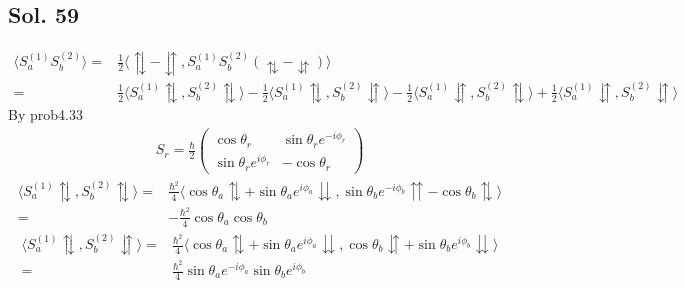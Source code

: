         \subsection*{Sol. 59}
        \begin{align*}
            \langle S_a^{(1)}S_b^{(2)}\rangle= & 
            \frac{1}{2}
            \langle \updownarrows - \downuparrows, 
            S_a^{(1)}S_b^{(2)}
            (\updownarrows - \downuparrows)
            \rangle\\
            =&
            \frac{1}{2}
            \langle S_a^{(1)}\updownarrows, S_b^{(2)}\updownarrows\rangle
            -\frac{1}{2}
            \langle S_a^{(1)}\updownarrows, S_b^{(2)}\downuparrows\rangle
            -\frac{1}{2}
            \langle S_a^{(1)}\downuparrows, S_b^{(2)}\updownarrows\rangle
            +\frac{1}{2}
            \langle S_a^{(1)}\downuparrows, S_b^{(2)}\downuparrows\rangle
        \end{align*}
        By prob4.33
        \begin{align*}
            S_r = \frac{\hbar}{2}
            \begin{pmatrix}
                \cos\theta_r & \sin\theta_r e^{-i\phi_r}\\
                \sin\theta_r e^{i\phi_r} & -\cos\theta_r
            \end{pmatrix}
        \end{align*}
        \begin{align*}
            \langle S_a^{(1)}\updownarrows, S_b^{(2)}\updownarrows\rangle = & 
            \frac{\hbar^2}{4}
            \langle
            \cos\theta_a\updownarrows + 
            \sin\theta_ae^{i\phi_a}\downdownarrows
            ,
            \sin\theta_b e^{-i\phi_b}\upuparrows -
            \cos\theta_b\updownarrows
            \rangle\\
            =&-\frac{\hbar^2}{4}\cos\theta_a\cos\theta_b
        \end{align*}
        \begin{align*}
            \langle S_a^{(1)}\updownarrows, S_b^{(2)}\downuparrows\rangle = & 
            \frac{\hbar^2}{4}
            \langle
            \cos\theta_a\updownarrows + 
            \sin\theta_ae^{i\phi_a}\downdownarrows
            ,
            \cos\theta_b \downuparrows +
            \sin\theta_be^{i\phi_b}\downdownarrows
            \rangle\\
            =&\frac{\hbar^2}{4}\sin\theta_ae^{-i\phi_a}\sin\theta_be^{i\phi_b}
        \end{align*}

